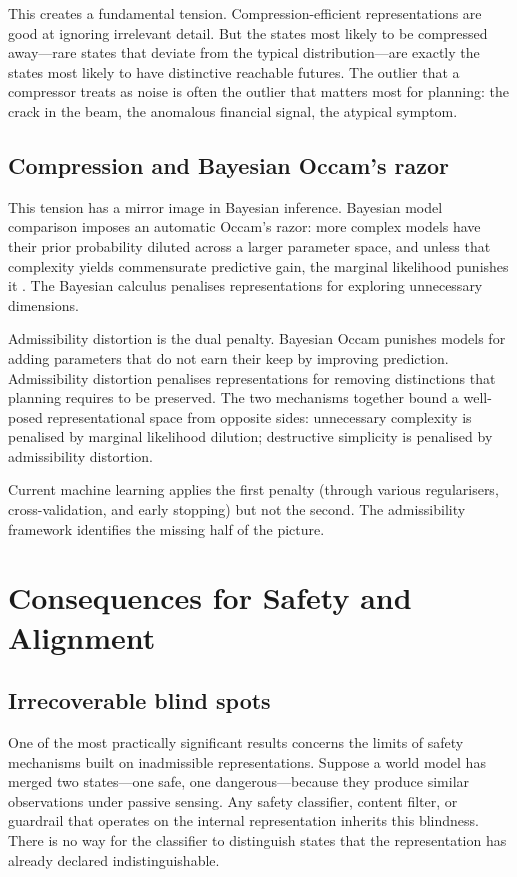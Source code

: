 \documentclass[11pt,a4paper]{article}
\begin{document}
This creates a fundamental tension. Compression-efficient representations are
good at ignoring irrelevant detail. But the states most likely to be compressed
away---rare states that deviate from the typical distribution---are exactly the
states most likely to have distinctive reachable futures. The outlier that a
compressor treats as noise is often the outlier that matters most for planning:
the crack in the beam, the anomalous financial signal, the atypical symptom.

\subsection{Compression and Bayesian Occam's razor}

This tension has a mirror image in Bayesian inference. Bayesian model comparison
imposes an automatic Occam's razor: more complex models have their prior
probability diluted across a larger parameter space, and unless that complexity
yields commensurate predictive gain, the marginal likelihood punishes it
\citep{jaynes2003probability}. The Bayesian calculus penalises representations
for exploring unnecessary dimensions.

Admissibility distortion is the dual penalty. Bayesian Occam punishes models
for adding parameters that do not earn their keep by improving prediction.
Admissibility distortion penalises representations for removing distinctions
that planning requires to be preserved. The two mechanisms together bound a
well-posed representational space from opposite sides: unnecessary complexity
is penalised by marginal likelihood dilution; destructive simplicity is penalised
by admissibility distortion.

Current machine learning applies the first penalty (through various regularisers,
cross-validation, and early stopping) but not the second. The admissibility
framework identifies the missing half of the picture.

\section{Consequences for Safety and Alignment}

\subsection{Irrecoverable blind spots}

One of the most practically significant results concerns the limits of safety
mechanisms built on inadmissible representations. Suppose a world model has
merged two states---one safe, one dangerous---because they produce similar
observations under passive sensing. Any safety classifier, content filter, or
guardrail that operates on the internal representation inherits this blindness.
There is no way for the classifier to distinguish states that the representation
has already declared indistinguishable.
\end{document}

